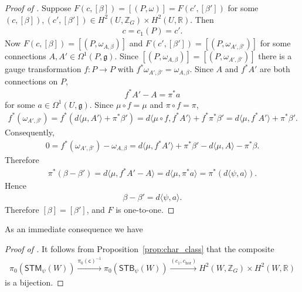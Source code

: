 \documentclass[pdftex]{sigma}
\numberwithin{equation}{section}
\begin{document}
\begin{proof}[Proof of ]
Suppose $F(c, [\beta]) = [(P,\omega)]= F(c',[\beta'])$ for some
$(c, [\beta]), (c',[\beta'])\in  H^2 (U, {\mathbb Z}_G)\times H^2 (U,{\mathbb R})$.  Then
\begin{gather*}
c = c_1(P) = c'.
\end{gather*}
Now $F(c, [\beta]) =[(P, \omega_{A,\beta})]$ and $F(c', [\beta'])
=[(P, \omega_{A',\beta'})]$ for some connections
$A,A'\in\Omega^1(P,{\mathfrak g})$.  Since $[(P, \omega_{A,\beta})]= [(P,
\omega_{A',\beta'})]$ there is a gauge transformation $f\colon P\to P$ with
$f^*\omega _{A',\beta'} = \omega_{A,\beta}$.  Since $A$ and $f^*A'$ are
  both connections on $P$,
\begin{gather*}
f^*A' - A = \pi^* a
\end{gather*}
for some $a\in \Omega^1 (U,{\mathfrak g})$.  Since $\mu \circ f = \mu$ and $\pi
\circ f = \pi$,
\begin{gather*}
f^*(\omega_{A',\beta'})= f^*( d \langle \mu , A'\rangle +\pi^*\beta')
= d \langle \mu\circ f , f^*A'\rangle +f^*\pi^*\beta' = d \langle \mu,
f^*A'\rangle +\pi^*\beta'.
\end{gather*}
Consequently,
\begin{gather*}
0 = f^*(\omega_{A',\beta'}) - \omega_{A,\beta} = d\langle \mu,
f^*A'\rangle +\pi^*\beta' - d\langle \mu, A\rangle -\pi^*\beta.
\end{gather*}
Therefore
\begin{gather*}
\pi^*(\beta -\beta') =d\langle \mu,
f^*A' -A \rangle = d \langle \mu , \pi^*a\rangle
= \pi^* (d\langle \psi, a\rangle).
\end{gather*}
Hence
\begin{gather*}
\beta -\beta' = d\langle \psi, a\rangle.
\end{gather*}
Therefore $[\beta] = [\beta']$, and $F$ is one-to-one.
\end{proof}

As an immediate consequence we have
\begin{proof}[Proof of ]
It follows from Proposition~\ref{prop:char_class} that the composite
\begin{gather*}
 \pi_0({\textsf{STM}}_\psi(W))\xrightarrow{ \pi_0({\textsf{c}})^{-1} } \pi_0({\textsf{STB}}_\psi (W))
 \xrightarrow{(c_1, c_{\text{hor}})} H^2 (W, {\mathbb Z}_G)\times H^2 (W,{\mathbb R})
\end{gather*}
is a bijection.
\end{proof}
\end{document}
